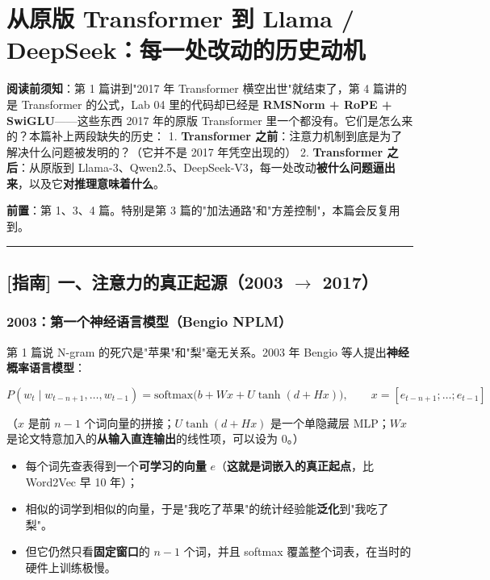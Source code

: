 \chapter{从原版 Transformer 到 Llama / DeepSeek：每一处改动的历史动机}

\begin{mathBox}[核心数学定理推导]
\textbf{阅读前须知}：第 1 篇讲到"2017 年 Transformer 横空出世"就结束了，第 4 篇讲的是 Transformer 的公式，Lab 04 里的代码却已经是 \textbf{RMSNorm + RoPE + SwiGLU}——这些东西 2017 年的原版 Transformer 里一个都没有。它们是怎么来的？本篇补上两段缺失的历史：
1. \textbf{Transformer 之前}：注意力机制到底是为了解决什么问题被发明的？（它并不是 2017 年凭空出现的）
2. \textbf{Transformer 之后}：从原版到 Llama-3、Qwen2.5、DeepSeek-V3，每一处改动\textbf{被什么问题逼出来}，以及它\textbf{对推理意味着什么}。

\textbf{前置}：第 1、3、4 篇。特别是第 3 篇的"加法通路"和"方差控制"，本篇会反复用到。
\end{mathBox}

\vspace{0.8em}\hrule\vspace{0.8em}

\section{[指南] 一、注意力的真正起源（2003 \texorpdfstring{$\rightarrow$}{->} 2017）}

\subsection{2003：第一个神经语言模型（Bengio NPLM）}

第 1 篇说 N-gram 的死穴是"苹果"和"梨"毫无关系。2003 年 Bengio 等人提出\textbf{神经概率语言模型}：

\[
P(w_t \mid w_{t-n+1}, \dots, w_{t-1}) = \text{softmax}\big(b + W x + U \tanh(d + H x)\big), \qquad x = [e_{t-n+1}; \dots; e_{t-1}]
\]

（$x$ 是前 $n-1$ 个词向量的拼接；$U\tanh(d + Hx)$ 是一个单隐藏层 MLP；$Wx$ 是论文特意加入的\textbf{从输入直连输出}的线性项，可以设为 0。）
\begin{itemize}
  \item 每个词先查表得到一个\textbf{可学习的向量} $e$（\textbf{这就是词嵌入的真正起点}，比 Word2Vec 早 10 年）；
  \item 相似的词学到相似的向量，于是"我吃了苹果"的统计经验能\textbf{泛化}到"我吃了梨"。
  \item 但它仍然只看\textbf{固定窗口}的 $n-1$ 个词，并且 softmax 覆盖整个词表，在当时的硬件上训练极慢。
\end{itemize}

